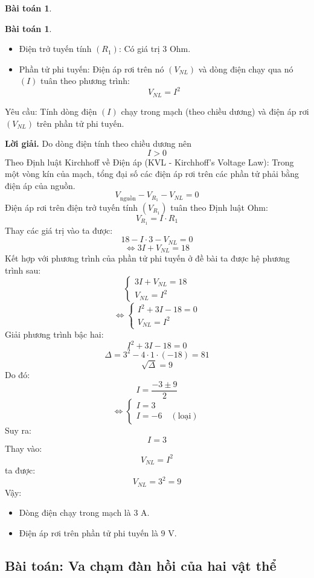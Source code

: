 \documentclass[12pt,a4paper,oneside]{book}
\theoremstyle{theorem}
\theoremstyle{definition}
\newtheorem{bt}[theorem2]{Bài toán}
\begin{document}
\begin{bt}
\begin{bt}
\begin{itemize}
    \item Điện trở tuyến tính \((R_1)\): Có giá trị \(3\) Ohm.

    \item Phần tử phi tuyến: Điện áp rơi trên nó \((V_{NL})\) và dòng điện chạy qua
    nó \((I)\) tuân theo phương trình: 
    \[ V_{NL}=I^2
    \]
\end{itemize}
Yêu cầu: Tính dòng điện \((I)\) chạy trong mạch (theo chiều dương) và điện
áp rơi \((V_{NL})\) trên phần tử phi tuyến.
\bigskip

\textbf{Lời giải.}
\medskip
Do dòng điện tính theo chiều dương nên
\[I>0
\]
Theo Định luật Kirchhoff về Điện áp (KVL - Kirchhoff’s Voltage Law):
Trong một vòng kín của mạch, tổng đại số các điện áp rơi trên các phần tử
phải bằng điện áp của nguồn.
\[
V_{\text{nguồn}}-V_{R_1}-V_{NL}=0
\]
Điện áp rơi trên điện trở tuyến tính \((V_{R_1})\) tuân theo Định luật Ohm:
\[
V_{R_1}=I\cdot R_1
\]
Thay các giá trị vào ta được:
\[
18-I\cdot3-V_{NL}=0
\]
\[
\Leftrightarrow 3I+V_{NL}=18
\]
Kết hợp với phương trình của phần tử phi tuyến ở đề bài ta được hệ phương
trình sau:
\[
\begin{cases}
3I+V_{NL}=18\\
V_{NL}=I^2
\end{cases}
\]
\[
\Leftrightarrow
\begin{cases}
I^2+3I-18=0\\
V_{NL}=I^2
\end{cases}
\]
Giải phương trình bậc hai:
\[
I^2+3I-18=0
\]
\[
\Delta=3^2-4\cdot1\cdot(-18)=81
\]
\[
\sqrt{\Delta}=9
\]
Do đó:
\[
I=\frac{-3\pm9}{2}
\]
\[
\Leftrightarrow
\begin{cases}
I=3\\
I=-6\quad(\text{loại})
\end{cases}
\]
Suy ra:
\[
I=3
\]
Thay vào:
\[
V_{NL}=I^2
\]
ta được:
\[
V_{NL}=3^2=9
\]
Vậy:
\begin{itemize}
    \item Dòng điện chạy trong mạch là \(3\) A.
    
    \item Điện áp rơi trên phần tử phi tuyến là \(9\) V.
\end{itemize}
\end{bt}

\subsection{Bài toán: Va chạm đàn hồi của hai vật thể}


\end{bt}
\end{document}
